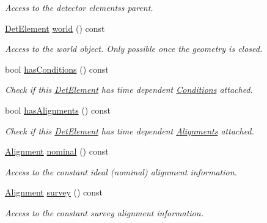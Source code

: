 \begin{DoxyCompactItemize}
\begin{DoxyCompactList}\small\item\em Access to the detector elements\textquotesingle{}s parent. \end{DoxyCompactList}\item 
\hyperlink{class_d_d4hep_1_1_geometry_1_1_det_element}{Det\+Element} \hyperlink{class_d_d4hep_1_1_geometry_1_1_det_element_ae073e3c383594d3deedba39172906a84}{world} () const
\begin{DoxyCompactList}\small\item\em Access to the world object. Only possible once the geometry is closed. \end{DoxyCompactList}\item 
bool \hyperlink{class_d_d4hep_1_1_geometry_1_1_det_element_a84cb757ef462d38cd9b185ccb448dcdf}{has\+Conditions} () const
\begin{DoxyCompactList}\small\item\em Check if this \hyperlink{class_d_d4hep_1_1_geometry_1_1_det_element}{Det\+Element} has time dependent \hyperlink{namespace_d_d4hep_1_1_conditions}{Conditions} attached. \end{DoxyCompactList}\item 
bool \hyperlink{class_d_d4hep_1_1_geometry_1_1_det_element_a55209501a68e88fb028f6c507bee8f61}{has\+Alignments} () const
\begin{DoxyCompactList}\small\item\em Check if this \hyperlink{class_d_d4hep_1_1_geometry_1_1_det_element}{Det\+Element} has time dependent \hyperlink{namespace_d_d4hep_1_1_alignments}{Alignments} attached. \end{DoxyCompactList}\item 
\hyperlink{class_d_d4hep_1_1_geometry_1_1_det_element_a5e5bddb6f1ba24c21af381b9bfeb3dba}{Alignment} \hyperlink{class_d_d4hep_1_1_geometry_1_1_det_element_a6d05a465352cd296917cf7df8a2f3b5c}{nominal} () const
\begin{DoxyCompactList}\small\item\em Access to the constant ideal (nominal) alignment information. \end{DoxyCompactList}\item 
\hyperlink{class_d_d4hep_1_1_geometry_1_1_det_element_a5e5bddb6f1ba24c21af381b9bfeb3dba}{Alignment} \hyperlink{class_d_d4hep_1_1_geometry_1_1_det_element_aec33daf8981acf912a9e8eb08fe68dee}{survey} () const
\begin{DoxyCompactList}\small\item\em Access to the constant survey alignment information. \end{DoxyCompactList}\item 

\end{DoxyCompactItemize}
